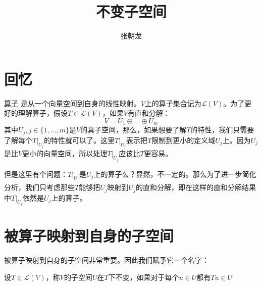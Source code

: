 \documentclass[10pt,a4paper,UTF8]{article}
\author{张朝龙}
\date{}
\title{不变子空间}
\begin{document}
\maketitle
\tableofcontents
{}

\section{回忆}
\label{sec:org358e2b0}


\href{invertible-isomorphic.org}{算子} 是从一个向量空间到自身的线性映射。\(V\)上的算子集合记为\(\mathcal{L}(V)\)。为了更好的理解算子，假设\(T\in \mathcal{L}(V)\)，如果\(V\)有直和分解：\[V  = U_{1} \oplus \ldots \oplus U_{m}\] 其中\(U_{j},j\in \{1,\ldots ,m\}\)是\(V\)的真子空间，那么，如果想要了解\(T\)的特性，我们只需要了解每个\(T|_{U_{j}}\)的特性就可以了。这里\(T|_{U_{j}}\)表示把\(T\)限制到更小的定义域\(U_{j}\)上。因为\(U_{j}\)是比\(V\)更小的向量空间，所以处理\(T|_{U_{j}}\)应该比\(T\)更容易。

但是这里有个问题：\(T|_{U_{j}}\)是\(U_{j}\)上的算子么？显然，不一定的。那么为了进一步简化分析，我们只考虑那些\(T\)能够把\(U_{j}\)映射到\(U_{j}\)的直和分解，即在这样的直和分解结果中\(T|_{U_{j}}\)依然是\(U_{j}\)上的算子。

\section{被算子映射到自身的子空间}
\label{sec:orgce61769}


被算子映射到自身的子空间非常重要。因此我们赋予它一个名字：
\begin{definition}
设\(T\in \mathcal{L}(V)\)，称\(V\)的子空间\(U\)在\(T\)下不变，如果对于每个\(u\in U\)都有\(Tu \in U\)
\end{definition}
\end{document}
